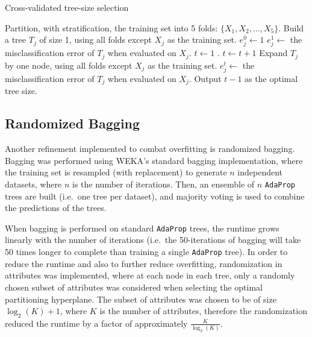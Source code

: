 \documentclass[a4paper,12pt]{report} %
\newcommand{\AdaProp}{\texttt{AdaProp}\xspace}
\begin{document}
\begin{algorithm}
\caption{Cross-validated tree-size selection}
\label{algoCVTSS} 
    \begin{algorithmic}
    \State Partition, with stratification, the training set into 5 folds: 
        $\{ X_1, X_2, \ldots, X_5 \}$.
        \State Build a tree $T_j$ of size 1, using all folds except $X_j$ as the training set.
        \State $e^0_j \gets 1$ 
        \State $e^1_j \gets$ the misclassification error of $T_j$ when evaluated on $X_j$.        
    \EndFor    
    \State $t \gets 1$ .    
        \State $t \gets t+1$
            \State Expand $T_j$ by one node, 
                using all folds except $X_j$ as the training set.
            \State $e^t_j \gets$ the misclassification error of $T_j$ when evaluated on $X_j$.
        \EndFor
    \EndWhile
    \State Output $t-1$ as the optimal tree size.
    \end{algorithmic}
\end{algorithm}


\subsection{Randomized Bagging}

Another refinement implemented to combat overfitting is 
    randomized bagging.
Bagging was performed using WEKA's standard bagging implementation, 
    where the training set is resampled (with replacement) to generate
    $n$ independent datasets, where $n$ is the number of iterations.
Then, an ensemble of $n$ \AdaProp trees are built (i.e.\ one tree per dataset), 
    and majority voting is used to combine the predictions of the trees.

When bagging is performed on standard \AdaProp trees, 
    the runtime grows linearly with the number of iterations
    (i.e.\ the 50-iterations of bagging will take 50 times longer
    to complete than training a single \AdaProp tree).
In order to reduce the runtime and also to further reduce overfitting, 
    randomization in attributes was implemented, 
    where at each node in each tree, only a randomly chosen subset of attributes 
    was considered when selecting the optimal partitioning hyperplane.
The subset of attributes was chosen to be of size $\log_2(K)+1$, 
    where $K$ is the number of attributes, 
    therefore the randomization reduced the runtime by a factor 
    of approximately $\frac{K}{\log_2(K)}$.
\end{document}
